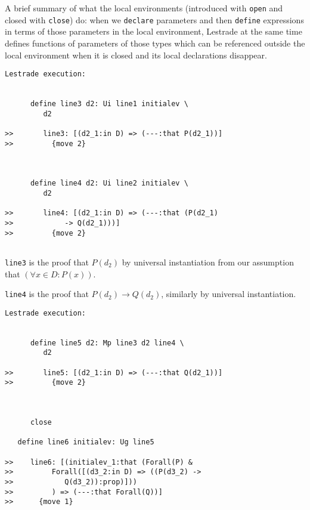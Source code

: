 \documentclass{slides}
\begin{document}
A brief summary of what the local environments (introduced with {\tt open} and closed with {\tt close}) do:  when we {\tt declare} parameters
and then {\tt define} expressions in terms of those parameters in the local environment, Lestrade at the same time defines functions of parameters of those types
which can be referenced outside the local environment when it is closed and its local declarations disappear.

\begin{slide}

{\tiny

\begin{verbatim}Lestrade execution:


      define line3 d2: Ui line1 initialev \
         d2

>>       line3: [(d2_1:in D) => (---:that P(d2_1))]
>>         {move 2}



      define line4 d2: Ui line2 initialev \
         d2

>>       line4: [(d2_1:in D) => (---:that (P(d2_1)
>>            -> Q(d2_1)))]
>>         {move 2}


\end{verbatim}

}

\end{slide}

{\tt line3} is the proof that $P(d_2)$ by universal instantiation from our assumption that $(\forall x \in D:P(x))$.

{\tt line4} is the proof that $P(d_2) \rightarrow Q(d_2)$, similarly by universal instantiation.

\begin{slide}
{\tiny
\begin{verbatim}Lestrade execution:


      define line5 d2: Mp line3 d2 line4 \
         d2

>>       line5: [(d2_1:in D) => (---:that Q(d2_1))]
>>         {move 2}



      close

   define line6 initialev: Ug line5

>>    line6: [(initialev_1:that (Forall(P) &
>>         Forall([(d3_2:in D) => ((P(d3_2) ->
>>            Q(d3_2)):prop)]))
>>         ) => (---:that Forall(Q))]
>>      {move 1}


\end{verbatim}
}

\end{slide}
\end{document}
